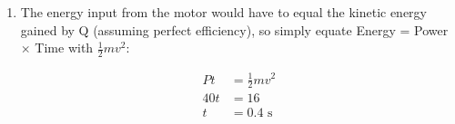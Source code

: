 \begin{problem}[AO1984PIQ1a]
{\begin{enumerate}
	\item The energy input from the motor would have to equal the kinetic energy gained by Q (assuming perfect efficiency), so simply equate Energy = Power $\times$ Time with $\frac{1}{2}mv^{2}$:

\begin{align*} 
Pt &= \frac{1}{2}mv^{2} \\
 40t &= 16 \\ 
 t&=0.4\text{ s} 
 \end{align*}

\end{enumerate}
}
\end{problem}
